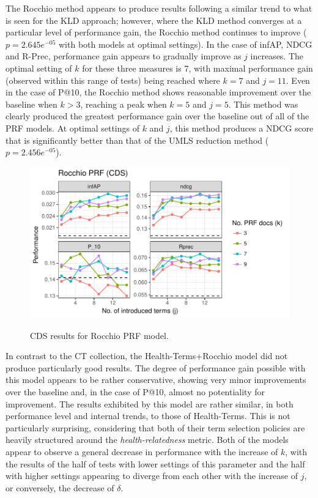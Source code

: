 \documentclass[a4paper]{report}
\begin{document}
The Rocchio method appears to produce results following a similar trend to what is seen for the KLD approach; however, where the KLD method converges at a particular level of performance gain, the Rocchio method continues to improve ($p=2.645e^{-05}$ with both models at optimal settings). In the case of infAP, NDCG and R-Prec, performance gain appears to gradually improve as $j$ increases. The optimal setting of $k$ for these three measures is 7, with maximal performance gain (observed within this range of tests) being reached where $k=7$ and $j=11$. Even in the case of P@10, the Rocchio method shows reasonable improvement over the baseline when $k>3$, reaching a peak when $k=5$ and $j=5$. This method was clearly produced the greatest performance gain over the baseline out of all of the PRF models. At optimal settings of $k$ and $j$, this method produces a NDCG score that is significantly better than that of the UMLS reduction method ($p=2.456e^{-05}$). 

\begin{figure}
\centering
\caption{CDS results for Rocchio PRF model.}
\includegraphics[width=.9\columnwidth]{cds-rocchioprf.pdf}
\label{cds_rocchioprf_results}
\end{figure}

In contrast to the CT collection, the Health-Terms+Rocchio model did not produce particularly good results. The degree of performance gain possible with this model appears to be rather conservative, showing very minor improvements over the baseline and, in the case of P@10, almost no potentiality for improvement. The results exhibited by this model are rather similar, in both performance level and internal trends, to those of Health-Terms. This is not particularly surprising, considering that both of their term selection policies are heavily structured around the \textit{health-relatedness} metric. Both of the models appear to observe a general decrease in performance with the increase of $k$, with the results of the half of tests with lower settings of this parameter and the half with higher settings appearing to diverge from each other with the increase of $j$, or conversely, the decrease of $\delta$. 
\end{document}
